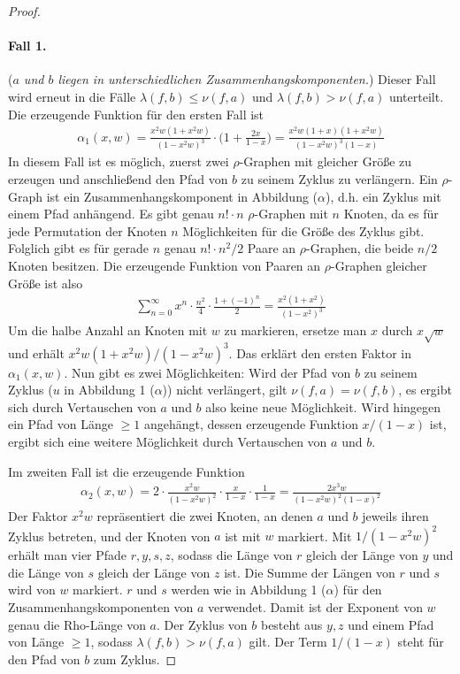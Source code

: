 \documentclass[a4paper, 10pt, ngerman]{article}
\begin{document}
\begin{proof}
    \paragraph{Fall 1.} (\emph{$a$ und $b$ liegen in unterschiedlichen Zusammenhangskomponenten.}) Dieser Fall wird erneut in die Fälle $\lambda(f, b) \le \nu(f, a)$ und $\lambda(f, b) > \nu(f, a)$ unterteilt. Die erzeugende Funktion für den ersten Fall ist
    \begin{align*}
        \alpha_1(x, w) = \frac {x^2w(1 + x^2w)} {(1 - x^2w)^3} \cdot \Bigg (1 + \frac {2x} {1 - x} \Bigg ) = \frac {x^2w(1 + x)(1 + x^2w)} {(1 - x^2w)^3(1 - x)}
    \end{align*}
    In diesem Fall ist es möglich, zuerst zwei $\rho$-Graphen mit gleicher Größe zu erzeugen und anschließend den Pfad von $b$ zu seinem Zyklus zu verlängern. Ein $\rho$-Graph ist ein Zusammenhangskomponent in Abbildung ($\alpha$), d.h. ein Zyklus mit einem Pfad anhängend. Es gibt genau $n! \cdot n$ $\rho$-Graphen mit $n$ Knoten, da es für jede Permutation der Knoten $n$ Möglichkeiten für die Größe des Zyklus gibt. Folglich gibt es für gerade $n$ genau $n! \cdot n^2/2$ Paare an $\rho$-Graphen, die beide $n/2$ Knoten besitzen. Die erzeugende Funktion von Paaren an $\rho$-Graphen gleicher Größe ist also
    \begin{align*}
        \sum_{n = 0}^\infty x^n \cdot \frac {n^2} 4 \cdot \frac {1 + (-1)^n} 2 = \frac {x^2(1 + x^2)} {(1 - x^2)^3}
    \end{align*}
    Um die halbe Anzahl an Knoten mit $w$ zu markieren, ersetze man $x$ durch $x \sqrt w$ und erhält $x^2w(1 + x^2w) / (1 - x^2w)^3$. Das erklärt den ersten Faktor in $\alpha_1(x, w)$. Nun gibt es zwei Möglichkeiten: Wird der Pfad von $b$ zu seinem Zyklus ($u$ in Abbildung 1 ($\alpha$)) nicht verlängert, gilt $\nu(f, a) = \nu(f, b)$, es ergibt sich durch Vertauschen von $a$ und $b$ also keine neue Möglichkeit. Wird hingegen ein Pfad von Länge $\ge 1$ angehängt, dessen erzeugende Funktion $x/(1 - x)$ ist, ergibt sich eine weitere Möglichkeit durch Vertauschen von $a$ und $b$.

    Im zweiten Fall ist die erzeugende Funktion
    \begin{align*}
        \alpha_2(x, w) = 2 \cdot \frac {x^2w} {(1 - x^2w)^2} \cdot  \frac x {1 - x} \cdot \frac {1}{1 - x} = \frac {2x^3w} {(1 - x^2w)^2 (1 - x)^2}
    \end{align*}
    Der Faktor $x^2w$ repräsentiert die zwei Knoten, an denen $a$ und $b$ jeweils ihren Zyklus betreten, und der Knoten von $a$ ist mit $w$ markiert. Mit $1 / (1 - x^2w)^2$ erhält man vier Pfade $r, y, s, z$, sodass die Länge von $r$ gleich der Länge von $y$ und die Länge von $s$ gleich der Länge von $z$ ist. Die Summe der Längen von $r$ und $s$ wird von $w$ markiert. $r$ und $s$ werden wie in Abbildung 1 ($\alpha$) für den Zusammenhangskomponenten von $a$ verwendet. Damit ist der Exponent von $w$ genau die Rho-Länge von $a$. Der Zyklus von $b$ besteht aus $y, z$ und einem Pfad von Länge $\ge 1$, sodass $\lambda(f, b) > \nu(f, a)$ gilt. Der Term $1 / (1 - x)$ steht für den Pfad von $b$ zum Zyklus.


\end{proof}
\end{document}
